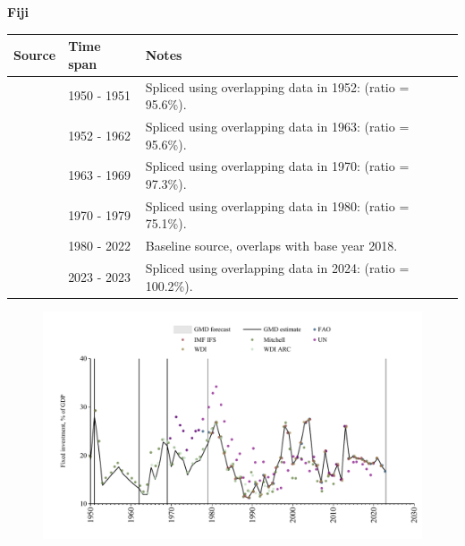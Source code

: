 \documentclass[12pt,a4paper,landscape]{article}
\begin{document}
\begin{adjustbox}{max totalsize={\paperwidth}{\paperheight},center}
\begin{minipage}[t][\textheight][t]{\textwidth}
\vspace*{0.5cm}
{}
\begin{center}
{\Large\bfseries Fiji}
\end{center}
\vspace{0.5cm}
\begin{table}[H]
\centering
\small
\begin{tabular}{|l|l|l|}
\hline
\textbf{Source} & \textbf{Time span} & \textbf{Notes} \\
\hline
\rowcolor{white}\cite{IMF_IFS}& 1950 - 1951 &Spliced using overlapping data in 1952: (ratio = 95.6\%).\\
\rowcolor{lightgray}\cite{Mitchell}& 1952 - 1962 &Spliced using overlapping data in 1963: (ratio = 95.6\%).\\
\rowcolor{white}\cite{WDI_ARC}& 1963 - 1969 &Spliced using overlapping data in 1970: (ratio = 97.3\%).\\
\rowcolor{lightgray}\cite{UN}& 1970 - 1979 &Spliced using overlapping data in 1980: (ratio = 75.1\%).\\
\rowcolor{white}\cite{WDI}& 1980 - 2022 &Baseline source, overlaps with base year 2018.\\
\rowcolor{lightgray}\cite{FAO}& 2023 - 2023 &Spliced using overlapping data in 2024: (ratio = 100.2\%).\\
\hline
\end{tabular}
\end{table}
\begin{figure}[H]
\centering
\includegraphics[width=\textwidth,height=0.6\textheight,keepaspectratio]{graphs/FJI_finv_GDP.pdf}
\end{figure}
\end{minipage}
\end{adjustbox}
\end{document}
